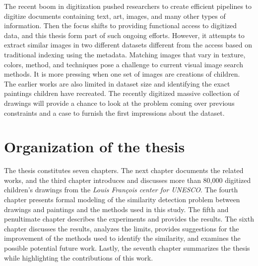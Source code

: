 The recent boom in digitization pushed researchers to create efficient pipelines to digitize documents containing text, art, images, and many other types of information. Then the focus shifts to providing functional access to digitized data, and this thesis form part of such ongoing efforts. However, it attempts to extract similar images in two different datasets different from the access based on traditional indexing using the metadata. Matching images that vary in texture, colors, method, and techniques pose a challenge to current visual image search methods. It is more pressing when one set of images are creations of children. The earlier works are also limited in dataset size and identifying the exact paintings children have recreated. The recently digitized massive collection of drawings will provide a chance to look at the problem coming over previous constraints and a case to furnish the first impressions about the dataset.


\section{Organization of the thesis}

The thesis constitutes seven chapters. The next chapter documents the related works, and the third chapter introduces and discusses more than 80,000 digitized children's drawings from the \textit{Louis François center for UNESCO}. The fourth chapter presents formal modeling of the similarity detection problem between drawings and paintings and the methods used in this study. The fifth and penultimate chapter describes the experiments and provides the results. The sixth chapter discusses the results, analyzes the limits, provides suggestions for the improvement of the methods used to identify the similarity, and examines the possible potential future work. Lastly, the seventh chapter summarizes the thesis while highlighting the contributions of this work. 